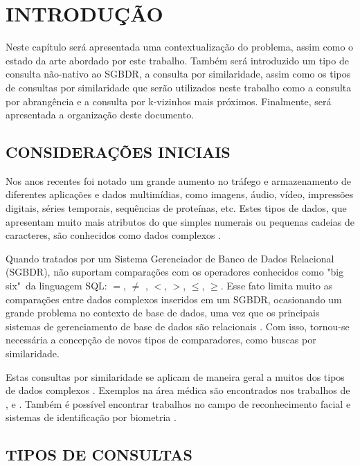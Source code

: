 \setcounter{page}{12}
\chapter{INTRODUÇÃO}
\label{chap:introducao}

Neste capítulo será apresentada uma contextualização do problema, assim como o estado da arte abordado por este trabalho.
Também será introduzido um tipo de consulta não-nativo ao SGBDR, a consulta por similaridade, assim como os tipos de consultas por similaridade
que serão utilizados neste trabalho como a consulta por abrangência e a consulta por k-vizinhos mais próximos. Finalmente, será apresentada a
organização deste documento.

\section{CONSIDERAÇÕES INICIAIS}
\label{sec:considini}

Nos anos recentes foi notado um grande aumento no tráfego e armazenamento de diferentes aplicações e dados multimídias, como imagens, áudio, vídeo, impressões digitais, séries temporais,
sequências de proteínas, etc. Estes tipos de dados, que apresentam muito mais atributos do que simples numerais ou pequenas cadeias de caracteres, são conhecidos como dados complexos \cite{Zighed2008}.\par
Quando tratados por um Sistema Gerenciador de Banco de Dados Relacional (SGBDR), não suportam comparações com os operadores conhecidos como "big six"\ da linguagem SQL: $=$, $\neq$ , $<$, $>$, $\leq$, $\geq$.
Esse fato limita muito as comparações entre dados complexos inseridos em um SGBDR, ocasionando um grande problema no contexto de base de dados, uma vez que os principais sistemas de gerenciamento
de base de dados são relacionais \cite{DBE2017}. Com isso, tornou-se necessária a concepção de novos tipos de comparadores, como buscas por similaridade.\par 

Estas consultas por similaridade se aplicam de maneira geral a muitos dos tipos de dados complexos \cite{Barioni2009}. Exemplos na área médica são encontrados nos trabalhos de 
\cite{Marchiori2001}, \cite{Bugatti2014} e \cite{Lehmann1999}. Também é possível encontrar trabalhos no campo de reconhecimento facial \cite{Gutta1997} e sistemas de identificação por biometria \cite{Choras2007}.

\section{TIPOS DE CONSULTAS}
\label{sec:tiposconsultas}

